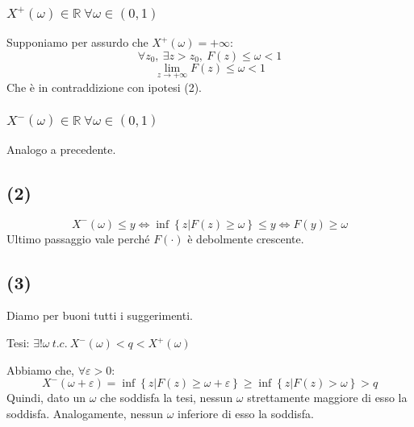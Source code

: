 \documentclass{article}
\begin{document}
\subsubsection{$X^+(\omega) \in \mathbb{R} \ \forall \omega\in \left(0,1\right)$}
Supponiamo per assurdo che $X^+ (\omega) = +\infty$:
\[
	\forall z_0, \ \exists z>z_0, \ F(z) \leq \omega < 1
\]
\[
	\lim_{z\rightarrow +\infty} F(z) \leq \omega < 1	
\]
Che è in contraddizione con ipotesi (2).
\subsubsection{$X^-(\omega) \in \mathbb{R} \ \forall \omega\in \left(0,1\right)$}
Analogo a precedente.


\subsection{(2)}
\[
	X^-(\omega) \leq y \Leftrightarrow \inf \left\{z| F(z) \geq \omega\right\} \leq y \Leftrightarrow F(y) \geq \omega
\]
Ultimo passaggio vale perché $F(\cdot)$ è debolmente crescente.

\subsection{(3)}
Diamo per buoni tutti i suggerimenti.

Tesi: $\exists! \omega \ t.c. \ X^-(\omega) < q < X^+(\omega)$

Abbiamo che, $\forall \varepsilon > 0$:
\[
	X^-(\omega+\varepsilon) = \inf \left\{z| F(z) \geq \omega+\varepsilon\right\} \geq \inf \left\{z| F(z) > \omega\right\} > q
\]
Quindi, dato un $\omega$ che soddisfa la tesi, nessun $\omega$ strettamente maggiore di esso la soddisfa. Analogamente, nessun $\omega$ inferiore di esso la soddisfa.
\end{document}
